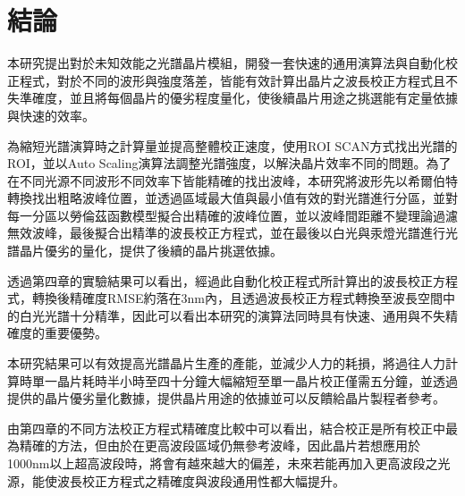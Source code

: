 \titlespacing{\chapter}{0cm}{-2cm}{0cm}
\chapter{結論}
本研究提出對於未知效能之光譜晶片模組，開發一套快速的通用演算法與自動化校正程式，對於不同的波形與強度落差，皆能有效計算出晶片之波長校正方程式且不失準確度，並且將每個晶片的優劣程度量化，使後續晶片用途之挑選能有定量依據與快速的效率。
\par
為縮短光譜演算時之計算量並提高整體校正速度，使用ROI SCAN方式找出光譜的ROI，並以Auto Scaling演算法調整光譜強度，以解決晶片效率不同的問題。為了在不同光源不同波形不同效率下皆能精確的找出波峰，本研究將波形先以希爾伯特轉換找出粗略波峰位置，並透過區域最大值與最小值有效的對光譜進行分區，並對每一分區以勞倫茲函數模型擬合出精確的波峰位置，並以波峰間距離不變理論過濾無效波峰，最後擬合出精準的波長校正方程式，並在最後以白光與汞燈光譜進行光譜晶片優劣的量化，提供了後續的晶片挑選依據。
\par
透過第四章的實驗結果可以看出，經過此自動化校正程式所計算出的波長校正方程式，轉換後精確度RMSE約落在3nm內，且透過波長校正方程式轉換至波長空間中的白光光譜十分精準，因此可以看出本研究的演算法同時具有快速、通用與不失精確度的重要優勢。
\par
本研究結果可以有效提高光譜晶片生產的產能，並減少人力的耗損，將過往人力計算時單一晶片耗時半小時至四十分鐘大幅縮短至單一晶片校正僅需五分鐘，並透過提供的晶片優劣量化數據，提供晶片用途的依據並可以反饋給晶片製程者參考。
\par
由第四章的不同方法校正方程式精確度比較中可以看出，結合校正是所有校正中最為精確的方法，但由於在更高波段區域仍無參考波峰，因此晶片若想應用於1000nm以上超高波段時，將會有越來越大的偏差，未來若能再加入更高波段之光源，能使波長校正方程式之精確度與波段通用性都大幅提升。